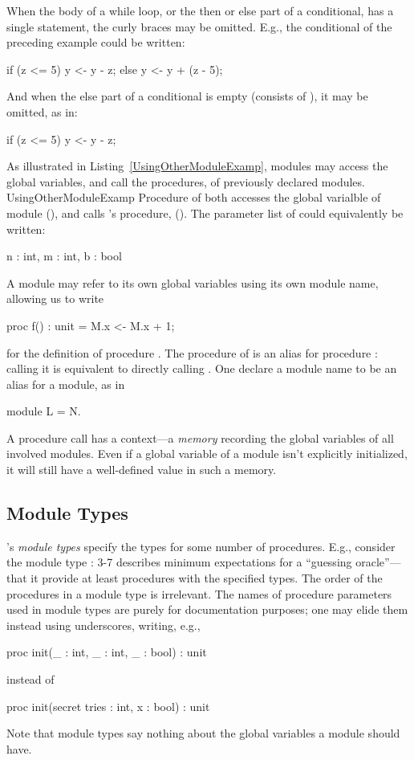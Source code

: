 When the body of a while loop, or the then or else part of a conditional,
has a single statement, the curly braces may be omitted. E.g., the
conditional of the preceding example could be written:
\begin{easycrypt}{}{}
if (z <= 5) y <- y - z;
else y <- y + (z - 5);
\end{easycrypt}
And when the else part of a conditional is empty (consists of
\ec{\{\}}), it may be omitted, as in:
\begin{easycrypt}{}{}
if (z <= 5) y <- y - z;
\end{easycrypt}

As illustrated in Listing~\ref{UsingOtherModuleExamp}, modules may
access the global variables, and call the procedures, of previously
declared modules.
 {}{UsingOtherModuleExamp} Procedure
 of  both accesses the global varialble  of module
 (), and calls 's procedure,  ().
The parameter list of  could equivalently be written:
\begin{easycrypt}{}{}
n : int, m : int, b : bool  
\end{easycrypt}
A module may refer to its own global variables using its own module
name, allowing us to write
\begin{easycrypt}{}{}
proc f() : unit = {
  M.x <- M.x + 1;
}
\end{easycrypt}
for the definition of procedure .  The procedure  of
 is an alias for procedure : calling it is equivalent to
directly calling .
One declare a module name to be an alias for a module, as in
\begin{easycrypt}{}{}
module L = N.
\end{easycrypt}

A procedure call has a context---a \emph{memory} recording the global
variables of all involved modules.  Even if a global variable of a
module isn't explicitly initialized, it will still have a well-defined
value in such a memory.

\subsection{Module Types}

\EasyCrypt's \emph{module types} specify the types for some number of
procedures.  E.g., consider the module type  :
 {3-7}{}
 describes minimum expectations
for a ``guessing oracle''---that it provide at least procedures with
the specified types.  The order of the procedures in a module type is
irrelevant.  The names of procedure parameters used in module types
are purely for documentation purposes; one may elide them instead
using underscores, writing, e.g.,
\begin{easycrypt}{}{}
proc init(_ : int, _ : int, _ : bool) : unit
\end{easycrypt}
instead of
\begin{easycrypt}{}{}
proc init(secret tries : int, x : bool) : unit
\end{easycrypt}
Note that module types say nothing about the global variables a module
should have.

